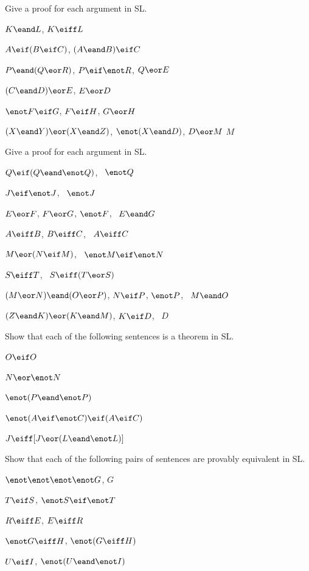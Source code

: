 \solutions
\problempart
\label{pr.solvedSLproofs}
Give a proof for each argument in SL.
\begin{earg}
\item $K\eand L$, \therefore $K\eiff L$
\item $A\eif (B\eif C)$, \therefore $(A\eand B)\eif C$
\item $P \eand (Q\eor R)$, $P\eif \enot R$, \therefore $Q\eor E$
\item $(C\eand D)\eor E$, \therefore $E\eor D$
\item $\enot F\eif G$, $F\eif H$, \therefore $G\eor H$
\item $(X\eand Y)\eor(X\eand Z)$, $\enot(X\eand D)$, $D\eor M$ \therefore $M$
\end{earg}

\problempart
Give a proof for each argument in SL.
\begin{earg}
\item $Q\eif(Q\eand\enot Q)$, \therefore\ $\enot Q$
\item $J\eif\enot J$, \therefore\ $\enot J$
\item $E\eor F$, $F\eor G$, $\enot F$, \therefore\ $E \eand G$
\item $A\eiff B$, $B\eiff C$, \therefore\ $A\eiff C$
\item $M\eor(N\eif M)$, \therefore\ $\enot M \eif \enot N$
\item $S\eiff T$, \therefore\ $S\eiff (T\eor S)$
\item $(M \eor N) \eand (O \eor P)$, $N \eif P$, $\enot P$, \therefore\ $M\eand O$
\item $(Z\eand K) \eor (K\eand M)$, $K \eif D$, \therefore\ $D$
\end{earg}


\solutions
\problempart
\label{pr.SLND.theorems}
Show that each of the following sentences is a theorem in SL.
\begin{earg}
\item $O \eif O$
\item $N \eor \enot N$
\item $\enot(P\eand \enot P)$
\item $\enot(A \eif \enot C) \eif (A \eif C)$
\item $J \eiff [J\eor (L\eand\enot L)]$
\end{earg}

\problempart
Show that each of the following pairs of sentences are provably equivalent in SL.
\begin{earg}
\item $\enot\enot\enot\enot G$, $G$
\item $T\eif S$, $\enot S \eif \enot T$
\item $R \eiff E$, $E \eiff R$
\item $\enot G \eiff H$, $\enot(G \eiff H)$
\item $U \eif I$, $\enot(U \eand \enot I)$
\end{earg}

